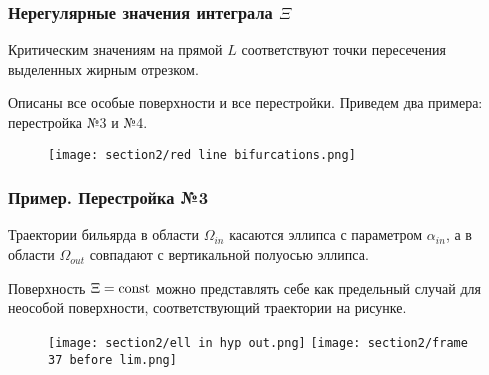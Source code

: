 %
%
%
%
%


\begin{frame}\frametitle{
Нерегулярные значения интеграла $\Xi$}

\qq Критическим значениям на прямой $L$ соответствуют точки пересечения выделенных жирным отрезком.  

\qq Описаны все особые поверхности и все перестройки. 
Приведем два примера: перестройка №3 и №4.


\begin{figure}[!htb]
\centering
\texttt{[image: section2/red line bifurcations.png]}
\end{figure}
\end{frame}





\begin{frame}\frametitle{Пример. Перестройка №3}
\qq Траектории бильярда в области $\Omega_{in}$ касаются эллипса с параметром $\alpha_{in}$, а в области $\Omega_{out}$ совпадают с вертикальной полуосью эллипса.

\qq Поверхность $\Xi = \mathrm{const}$  можно представлять себе как предельный случай для неособой поверхности, соответствующий траектории на рисунке. 
\begin{figure}[!htb]
\centering
    \texttt{[image: section2/ell in hyp out.png]}
\endminipage\hfill
{}
\centering
    \texttt{[image: section2/frame 37 before lim.png]}
\endminipage\hfill
\end{figure}
\end{frame}

